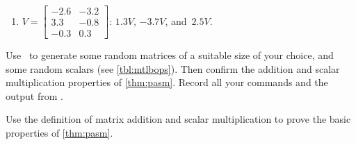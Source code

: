 \begin{exercise}
\begin{enumerate}
\item \(V=\begin{bmatrix} -2.6&-3.2
\\3.3&-0.8
\\-0.3&0.3 \end{bmatrix}\):
\(1.3V\), \(-3.7V\), and~\(2.5V\).


\end{enumerate}
\end{exercise}







\begin{exercise} \label{ex:} 
Use \script\ to generate some random matrices of a suitable size of your choice, and some random scalars (see \autoref{tbl:mtlbops}).
Then confirm the addition and scalar multiplication properties of \autoref{thm:pasm}.
Record all your commands and the output from \script.
\end{exercise}


\begin{exercise} \label{ex:} 
Use the definition of matrix addition and scalar multiplication to prove the basic properties of \autoref{thm:pasm}. 
\end{exercise}







